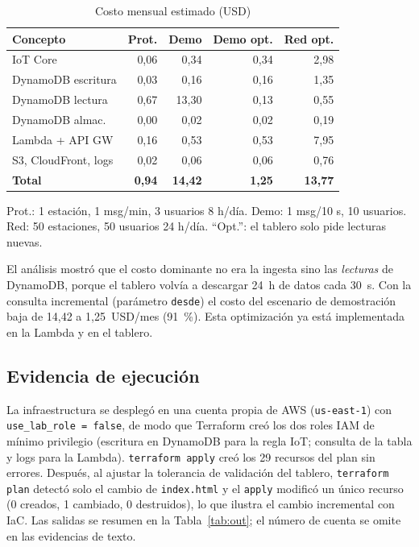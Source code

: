 \documentclass[10pt,twocolumn,letterpaper]{article}
\begin{document}
\begin{table}[t]
\caption{Costo mensual estimado (USD)}
\label{tab:cost}
\centering\footnotesize
\begin{tabular}{@{}lrrrr@{}}
\toprule
Concepto & Prot. & Demo & Demo opt. & Red opt.\\
\midrule
IoT Core & 0,06 & 0,34 & 0,34 & 2,98\\
DynamoDB escritura & 0,03 & 0,16 & 0,16 & 1,35\\
DynamoDB lectura & 0,67 & 13,30 & 0,13 & 0,55\\
DynamoDB almac. & 0,00 & 0,02 & 0,02 & 0,19\\
Lambda + API GW & 0,16 & 0,53 & 0,53 & 7,95\\
S3, CloudFront, logs & 0,02 & 0,06 & 0,06 & 0,76\\
\midrule
\textbf{Total} & \textbf{0,94} & \textbf{14,42} & \textbf{1,25} & \textbf{13,77}\\
\bottomrule
\end{tabular}
\vspace{0.2em}

\raggedright\scriptsize Prot.: 1 estación, 1 msg/min, 3 usuarios 8 h/día. Demo: 1 msg/10 s, 10 usuarios. Red: 50 estaciones, 50 usuarios 24 h/día. ``Opt.'': el tablero solo pide lecturas nuevas.
\end{table}

El análisis mostró que el costo dominante no era la ingesta sino las \emph{lecturas} de DynamoDB, porque el tablero volvía a descargar 24~h de datos cada 30~s. Con la consulta incremental (parámetro \texttt{desde}) el costo del escenario de demostración baja de 14,42 a 1,25~USD/mes (91~\%). Esta optimización ya está implementada en la Lambda y en el tablero.

\subsection{Evidencia de ejecución}\label{sec:evid}
La infraestructura se desplegó en una cuenta propia de AWS (\texttt{us-east-1}) con \texttt{use\_lab\_role = false}, de modo que Terraform creó los dos roles IAM de mínimo privilegio (escritura en DynamoDB para la regla IoT; consulta de la tabla y logs para la Lambda). \texttt{terraform apply} creó los 29 recursos del plan sin errores. Después, al ajustar la tolerancia de validación del tablero, \texttt{terraform plan} detectó solo el cambio de \texttt{index.html} y el \texttt{apply} modificó un único recurso (0 creados, 1 cambiado, 0 destruidos), lo que ilustra el cambio incremental con IaC. Las salidas se resumen en la Tabla~\ref{tab:out}; el número de cuenta se omite en las evidencias de texto.
\end{document}
